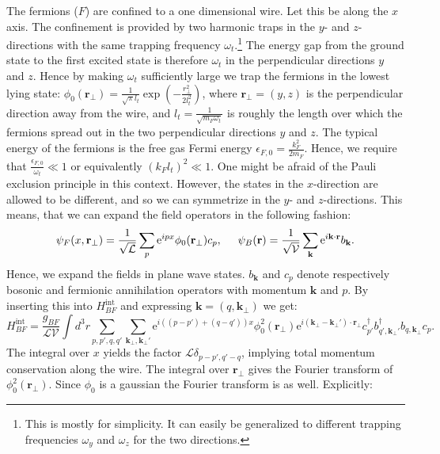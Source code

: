 The fermions ($F$) are confined to a one dimensional wire. Let this be along the $x$ axis. The confinement is provided by two harmonic traps in the $y$- and $z$-directions with the same trapping frequency $\omega_t$.\footnote{This is mostly for simplicity. It can easily be generalized to different trapping frequencies $\omega_y$ and $\omega_z$ for the two directions.} The energy gap from the ground state to the first excited state is therefore $\omega_t$ in the perpendicular directions $y$ and $z$. Hence by making $\omega_t$ sufficiently large we trap the fermions in the lowest lying state: $\phi_0(\mathbf{r}_\perp) = \frac{1}{\sqrt{\pi}l_t}\exp\left(-\frac{r_\perp^2}{2l_t^2}\right)$, where $\mathbf{r}_\perp = (y,z)$ is the perpendicular direction away from the wire, and $l_t = \frac{1}{\sqrt{m_F \omega_t}}$ is roughly the length over which the fermions spread out in the two perpendicular directions $y$ and $z$. The typical energy of the fermions is the free gas Fermi energy $\epsilon_{F,0} = \frac{k_F^2}{2m_F}$. Hence, we require that $\frac{\epsilon_{F,0}}{\omega_t} \ll 1$ or equivalently $(k_Fl_t)^2\ll 1$. One might be afraid of the Pauli exclusion principle in this context. However, the states in the $x$-direction are allowed to be different, and so we can symmetrize in the $y$- and $z$-directions. This means, that we can expand the field operators in the following fashion:
\begin{equation}
\psi_F(x,\mathbf{r}_\perp) = \frac{1}{\sqrt{\mathcal{L}}}\sum_p \text{e}^{ipx} \phi_0(\mathbf{r}_\perp) c_p, \hspace{0.5cm} \psi_B(\mathbf{r}) = \frac{1}{\sqrt{\mathcal{V}}}\sum_{\mathbf{k}} \text{e}^{i\mathbf{k}\cdot \mathbf{r}} b_\mathbf{k}. 
\end{equation}   
Hence, we expand the fields in plane wave states. $b_\mathbf{k}$ and $c_p$ denote respectively bosonic and fermionic annihilation operators with momentum $\mathbf{k}$ and $p$. By inserting this into $H_{BF}^\text{int}$ and expressing $\mathbf{k} = (q,\mathbf{k}_\perp)$ we get:
\begin{equation}
H_{BF}^\text{int} = \frac{g_{BF}}{\mathcal{LV}}\int d^3 r \sum_{p,p',q,q'}\sum_{\mathbf{k}_{\perp},\mathbf{k}_{\perp}'}\text{e}^{i((p-p')+(q-q'))x} \phi^2_0(\mathbf{r}_{\perp})\text{e}^{i(\mathbf{k}_{\perp}-\mathbf{k}_{\perp}')\cdot \mathbf{r}_\perp} c^\dagger_{p'} b^\dagger_{q',\mathbf{k}_\perp'}b_{q,\mathbf{k}_\perp}c_p. \nonumber
\end{equation}
The integral over $x$ yields the factor $\mathcal{L}\delta_{p-p',q'-q}$, implying total momentum conservation along the wire. The integral over $\mathbf{r}_\perp$ gives the Fourier transform of $\phi_0^2(\mathbf{r}_\perp)$. Since $\phi_0$ is a gaussian the Fourier transform is as well. Explicitly:
